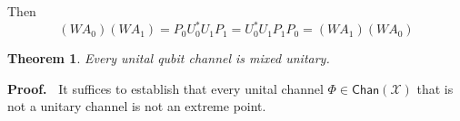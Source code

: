 \documentclass[aps,pra,onecolumn,notitlepage,superscriptaddress]{revtex4-1}
\newcommand{\spc}[1]{\mathcal{#1}}
\newcommand{\Chan}{{\mathsf{Chan}}}
\newtheorem{theo}{Theorem}
\def\Proof{{\bf Proof.~}}
\begin{document}
{        Then
        \begin{equation}
            (WA_0)(WA_1) = P_0U_0^*U_1P_1 = U_0^*U_1P_1P_0 = (WA_1)(WA_0)
        \end{equation}

    }

    \begin{theo}
        Every unital qubit channel is mixed unitary.
    \end{theo}
    \Proof {
        It suffices to establish that every unital channel $\Phi \in \Chan(\spc X)$ that is not a unitary channel is not an extreme point.
    }
    
\end{document}
